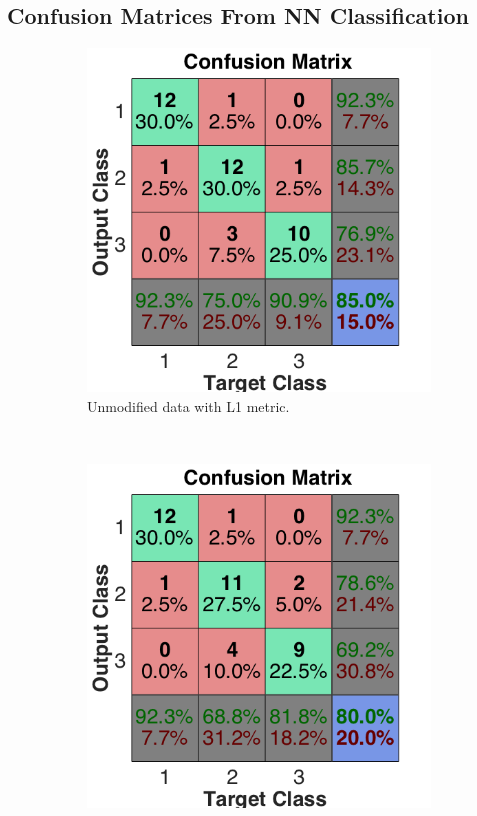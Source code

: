 \documentclass[a4paper, 10pt, conference]{ieeeconf}
\begin{document}
\subsection*{Confusion Matrices From NN Classification}
\begin{figure}[!ht]
  \captionsetup[subfigure]{position=b}
  \centering
    \begin{subfigure}{0.32\textwidth}
      \includegraphics[width=\textwidth]{pic/unmod_l1.png}
      \caption{Unmodified data with L1 metric. }
    \end{subfigure}
    ~
    \begin{subfigure}{0.32\textwidth}
      \includegraphics[width=\textwidth]{pic/unmod_l2.png}

\end{subfigure}
\end{figure}
\end{document}
